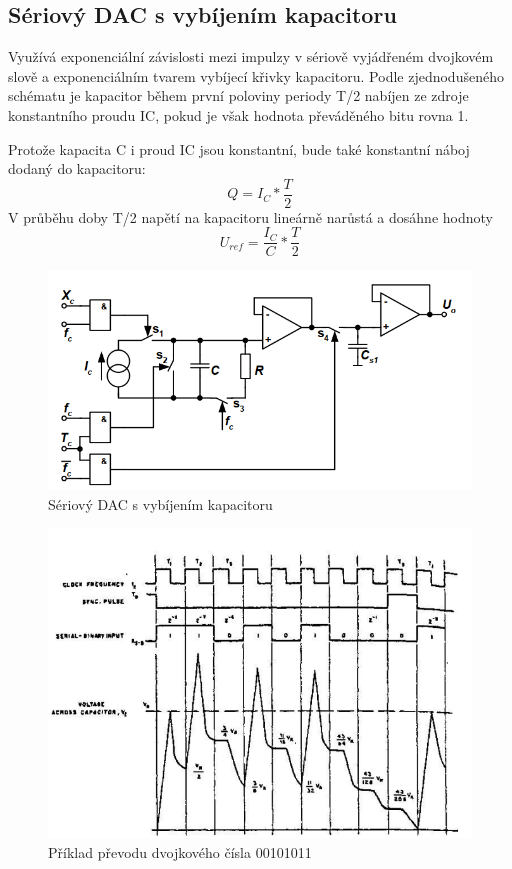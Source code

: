 \subsection{Sériový DAC s vybíjením kapacitoru}
Využívá exponenciální závislosti mezi impulzy v sériově vyjádřeném dvojkovém slově a exponenciálním tvarem vybíjecí křivky kapacitoru. Podle zjednodušeného schématu je kapacitor během první poloviny periody T/2 nabíjen ze zdroje konstantního proudu IC, pokud je však hodnota převáděného bitu rovna 1.

Protože kapacita C i proud IC jsou konstantní, bude také konstantní náboj dodaný do kapacitoru:
\begin{equation}
Q=I_{C}*\frac{T}{2}
\end{equation}
V průběhu doby T/2 napětí na kapacitoru lineárně narůstá a dosáhne hodnoty
\begin{equation}
U_{ref}=\frac{I_{C}}{C}*\frac{T}{2}
\end{equation}

\begin{figure}[h]
   \begin{center}
     \includegraphics[scale=0.6]{images/DACC.png}
   \end{center}
   \caption{Sériový DAC s vybíjením kapacitoru}
\end{figure}

\begin{figure}[h]
   \begin{center}
     \includegraphics[scale=0.6]{images/DAgraf.png}
   \end{center}
   \caption{Příklad převodu dvojkového čísla 00101011}
\end{figure}
\newpage
